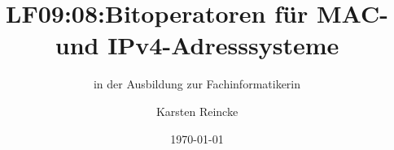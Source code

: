 \documentclass[]{beamer}
\title{LF09:08:Bitoperatoren für MAC- und IPv4-Adresssysteme}
\subtitle{in der Ausbildung zur Fachinformatikerin}
\institute{GS-LDK}
\author{Karsten Reincke}
\date{\today}
\def\cfgGl{../../../cfg.gl/}
\begin{document}

\begin{frame}
  \titlepage
\end{frame}






\logo{}
\newpage



%
\end{document}
